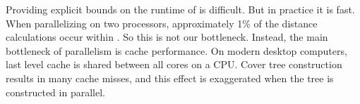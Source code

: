 \documentclass[../main.tex]{subfiles}
\newcommand{\mkprocedure}[1]{\textnormal{\ttfamily {#1}}}
\begin{document}
Providing explicit bounds on the runtime of \mkprocedure{merge} is difficult.
But in practice it is fast.
When parallelizing on two processors, approximately 1\% of the distance calculations occur within \mkprocedure{merge}. %
So this is not our bottleneck.
Instead, the main bottleneck of parallelism is cache performance.
On modern desktop computers, last level cache is shared between all cores on a CPU.
Cover tree construction results in many cache misses,
and this effect is exaggerated when the tree is constructed in parallel.

\end{document}
